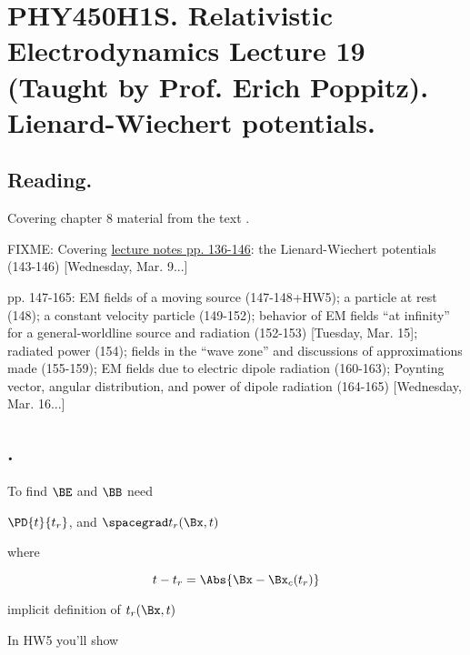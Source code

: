 
%

\chapter{PHY450H1S.  Relativistic Electrodynamics Lecture 19 (Taught by Prof. Erich Poppitz).  Lienard-Wiechert potentials.}
\label{chap:relativisticElectrodynamicsL19}
{}
\date{Mar 15, 2011}

\beginArtNoToc

\section{Reading.}

Covering chapter 8 material from the text \cite{landau1980classical}.

FIXME:
Covering \href{http://www.physics.utoronto.ca/~poppitz/epoppitz/PHY450_files/RelEMpp136-146.pdf}{lecture notes pp. 136-146}: the Lienard-Wiechert potentials (143-146) [Wednesday, Mar. 9...]

pp. 147-165: EM fields of a moving source (147-148+HW5); a particle at rest (148); a constant velocity particle (149-152); behavior of EM fields ``at infinity'' for a general-worldline source and radiation (152-153) [Tuesday, Mar. 15]; radiated power (154); fields in the ``wave zone'' and discussions of approximations made (155-159); EM fields due to electric dipole radiation (160-163); Poynting vector, angular distribution, and power of dipole radiation (164-165) [Wednesday, Mar. 16...]

\section{.}

To find $\BE$ and $\BB$ need 

$\PD{t}{t_r}$, and $\spacegrad t_r(\Bx, t)$

where 

\begin{equation}\label{eqn:relativisticElectrodynamicsT4:n}
t - t_r = \Abs{\Bx - \Bx_c(t_r) }
\end{equation}

implicit definition of $t_r(\Bx, t)$

In HW5 you'll show


